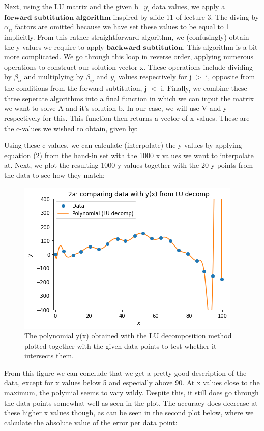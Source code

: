 Next, using the LU matrix and the given b=$y_i$ data values, we apply a $\textbf{forward subtitution algorithm}$ inspired by slide 11 of lecture 3. The diving by $\alpha_{ii}$ factors are omitted because we have set these values to be equal to 1 implicitly. From this rather straightforward algorithm, we (confusingly) obtain the y values we require to apply $\textbf{backward subtitution}$. This algorithm is a bit more complicated. We go through this loop in reverse order, applying numerous operations to construct our solution vector x. These operations include dividing by $\beta_{ii}$ and multiplying by $\beta_{ij}$ and $y_i$ values respectively for j $>$ i, opposite from the conditions from the forward subtitution, j $<$ i. Finally, we combine these three seperate algorithms into a final function in which we can input the matrix we want to solve A and it's solution b. In our case, we will use V and y respectively for this. This function then returns a vector of x-values. These are the c-values we wished to obtain, given by:



Using these c values, we can calculate (interpolate) the y values by applying equation (2) from the hand-in set with the 1000 x values we want to interpolate at. Next, we plot the resulting 1000 y values together with the 20 y points from the data to see how they match:

\begin{figure}[h!]
  \centering
  \includegraphics[width=0.6\linewidth]{problem2a1.png}
  \caption{The polynomial y(x) obtained with the LU decomposition method plotted together with the given data points to test whether it intersects them.}
  \label{fig:fig1}
\end{figure}

From this figure we can conclude that we get a pretty good description of the data, except for x values below 5 and especially above 90. At x values close to the maximum, the polymial seems to vary wildy. Despite this, it still does go through the data points somewhat well as seen in the plot. The accuracy does decrease at these higher x values though, as can be seen in the second plot below, where we calculate the absolute value of the error per data point:


